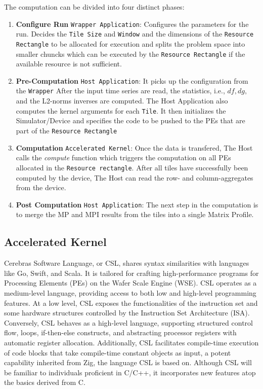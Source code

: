 The computation can be divided into four distinct phases:
\begin{enumerate}
    \item \textbf{Configure Run} \texttt{Wrapper Application}: Configures the parameters for the run. Decides the \texttt{Tile Size} and \texttt{Window} and the dimensions of the \texttt{Resource Rectangle} to be allocated for execution and splits the problem space into smaller chuncks which can be executed by the \texttt{Resource Rectangle} if the available resource is not sufficient.
    \item \textbf{Pre-Computation} \texttt{Host Application}: It picks up the configuration from the \texttt{Wrapper} After the input time series are read, the statistics, i.e., $df, dg, $ and the L2-norms inverses are computed. The Host Application also computes the kernel arguments for each \texttt{Tile}. It then initializes the Simulator/Device and specifies the code to be pushed to the PEs that are part of the \texttt{Resource Rectangle}
    \item \textbf{Computation} \texttt{Accelerated Kernel}: Once the data is transfered, The Host calls the \textit{compute} function which triggers the computation on all PEs allocated in the \texttt{Resource rectangle}. After all tiles have successfully been computed by the device, The Host can read the row- and column-aggregates from the device.
    \item \textbf{Post Computation} \texttt{Host Application}: The next step in the computation is to merge the MP and MPI results from the tiles into a single Matrix Profile.
\end{enumerate}


\subsection{Accelerated Kernel} \label{subsection:accelerated_kernel}

Cerebras Software Language, or CSL, shares syntax similarities with languages like Go, Swift, and Scala. It is tailored for crafting high-performance programs for Processing Elements (PEs) on the Wafer Scale Engine (WSE). CSL operates as a medium-level language, providing access to both low and high-level programming features. At a low level, CSL exposes the functionalities of the instruction set and some hardware structures controlled by the Instruction Set Architecture (ISA). Conversely, CSL behaves as a high-level language, supporting structured control flow, loops, if-then-else constructs, and abstracting processor registers with automatic register allocation. Additionally, CSL facilitates compile-time execution of code blocks that take compile-time constant objects as input, a potent capability inherited from Zig, the language CSL is based on. Although CSL will be familiar to individuals proficient in C/C++, it incorporates new features atop the basics derived from C.

